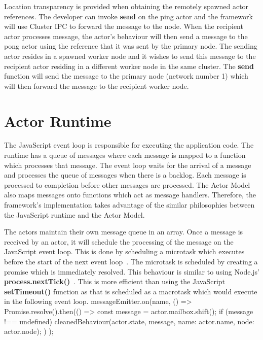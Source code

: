 \documentclass[12pt, a4paper]{report}
\newenvironment{code}
{\footnotesize\verbatim}{\endverbatim\normalfont}
\theoremstyle{definition}
\theoremstyle{definition}%
\theoremstyle{definition}%
\theoremstyle{definition}%
\theoremstyle{definition}%
\theoremstyle{definition}%
\begin{document}
Location transparency is provided when obtaining the remotely spawned actor references. The developer can invoke \textbf{send} on the ping actor and the framework will use Cluster IPC to forward the message to the node. When the recipient actor processes message, the actor's behaviour will then send a message to the pong actor using the reference that it was sent by the primary node. The sending actor resides in a spawned worker node and it wishes to send this message to the recipient actor residing in a different worker node in the same cluster. The \textbf{send} function will send the message to the primary node (network number 1) which will then forward the message to the recipient worker node.

\section{Actor Runtime}
The JavaScript event loop is responsible for executing the application code. The runtime has a queue of messages where each message is mapped to a function which processes that message. The event loop waits for the arrival of a message and processes the queue of messages when there is a backlog. Each message is processed to completion before other messages are processed. The Actor Model also maps messages onto functions which act as message handlers. Therefore, the framework's implementation takes advantage of the similar philosophies between the JavaScript runtime and the Actor Model.

The actors maintain their own message queue in an array. Once a message is received by an actor, it will schedule the processing of the message on the JavaScript event loop. This is done by scheduling a microtask which executes before the start of the next event loop~\cite{eventloopbrowser}\cite{eventloopnode}. The microtask is scheduled by creating a promise which is immediately resolved. This behaviour is similar to using Node.js' \textbf{process.nextTick()}~\cite{nexttick}. This is more efficient than using the JavaScript \textbf{setTimeout()} function as that is scheduled as a macrotask which would execute in the following event loop.
\begin{code}
messageEmitter.on(name, () => {
    Promise.resolve().then(() => {
        const message = actor.mailbox.shift();
        if (message !== undefined)
            cleanedBehaviour(actor.state, message, 
            {name: actor.name, node: actor.node});
    })
});
\end{code}
\end{document}
